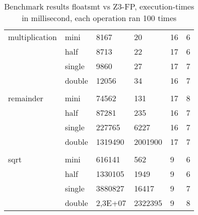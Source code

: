 \documentclass[a4paper,UKenglish,cleveref, autoref, thm-restate]{lipics-v2019}
\begin{document}
\begin{center}
\begin{table}[]
\begin{tabular}{ll|ll|ll}
			multiplication & mini     & 8167       & 20       & 16         & 6        \\
			& half     & 8713       & 22       & 17         & 6        \\
			& single   & 9860       & 27       & 17         & 7        \\
			& double   & 12056      & 34       & 16         & 7        \\
			&          &            &          &            &          \\
			remainder      & mini     & 74562      & 131      & 17         & 8        \\
			& half     & 87281      & 235      & 16         & 7        \\
			& single   & 227765     & 6227     & 16         & 7        \\
			& double   & 1319490    & 2001900  & 17         & 7        \\
			&          &            &          &            &          \\
			sqrt           & mini     & 616141     & 562      & 9          & 6        \\
			& half     & 1330105    & 1949     & 9          & 6        \\
			& single   & 3880827    & 16417    & 9          & 7        \\
			& double   & 2,3E+07    & 2322395  & 9          & 8       
		\end{tabular}
	\caption{Benchmark results floatsmt vs Z3-FP, execution-times in millisecond, each operation ran 100 times}
	\label{tab:performance}
	\end{table}
\end{center}
\end{document}
